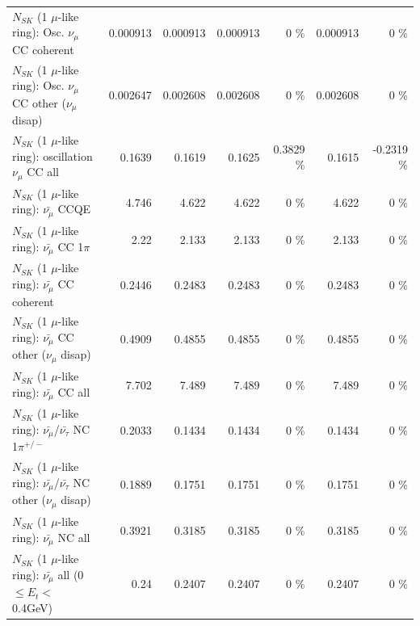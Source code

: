 \begin{table}
\begin{tabular}{| l | r | r | r  r | r  r |}
                        $N_{SK}$ (1 $\mu$-like ring): Osc. $\nu_\mu$ CC coherent &        0.000913 &        0.000913 &        0.000913 &        0 \%  &        0.000913 &        0 \%  \\ 
         $N_{SK}$ (1 $\mu$-like ring): Osc. $\nu_\mu$ CC other ($\nu_\mu$ disap) &        0.002647 &        0.002608 &        0.002608 &        0 \%  &        0.002608 &        0 \%  \\ 
                      $N_{SK}$ (1 $\mu$-like ring): oscillation $\nu_\mu$ CC all &          0.1639 &          0.1619 &          0.1625 &   0.3829 \%  &          0.1615 &  -0.2319 \%  \\ 
\hline
\hline
                              $N_{SK}$ (1 $\mu$-like ring): $\bar{\nu_\mu}$ CCQE &           4.746 &           4.622 &           4.622 &        0 \%  &           4.622 &        0 \%  \\ 
                         $N_{SK}$ (1 $\mu$-like ring): $\bar{\nu_\mu}$ CC 1$\pi$ &            2.22 &           2.133 &           2.133 &        0 \%  &           2.133 &        0 \%  \\ 
                       $N_{SK}$ (1 $\mu$-like ring): $\bar{\nu_\mu}$ CC coherent &          0.2446 &          0.2483 &          0.2483 &        0 \%  &          0.2483 &        0 \%  \\ 
        $N_{SK}$ (1 $\mu$-like ring): $\bar{\nu_\mu}$ CC other ($\nu_\mu$ disap) &          0.4909 &          0.4855 &          0.4855 &        0 \%  &          0.4855 &        0 \%  \\ 
                          $N_{SK}$ (1 $\mu$-like ring): $\bar{\nu_{\mu}}$ CC all &           7.702 &           7.489 &           7.489 &        0 \%  &           7.489 &        0 \%  \\ 
\hline
  $N_{SK}$ (1 $\mu$-like ring): $\bar{\nu_\mu}$/$\bar{\nu_\tau}$ NC 1$\pi^{+/-}$ &          0.2033 &          0.1434 &          0.1434 &        0 \%  &          0.1434 &        0 \%  \\ 
$N_{SK}$ (1 $\mu$-like ring): $\bar{\nu_\mu}$/$\bar{\nu_\tau}$ NC other ($\nu_\mu$ disap) &          0.1889 &          0.1751 &          0.1751 &        0 \%  &          0.1751 &        0 \%  \\ 
                          $N_{SK}$ (1 $\mu$-like ring): $\bar{\nu_{\mu}}$ NC all &          0.3921 &          0.3185 &          0.3185 &        0 \%  &          0.3185 &        0 \%  \\ 
\hline
   $N_{SK}$ (1 $\mu$-like ring): $\bar{\nu_{\mu}}$ all (0 $\leq E_{t} <$ 0.4GeV) &            0.24 &          0.2407 &          0.2407 &        0 \%  &          0.2407 &        0 \%  \\ 

\end{tabular}
\end{table}
